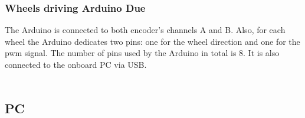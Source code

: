 
\subsubsection{Wheels driving Arduino Due}
The Arduino is connected to both encoder's channels A and B. Also, for each wheel the Arduino dedicates two pins: one for the wheel direction and one for the pwm signal. The number of 
pins used by the Arduino in total is 8. It is also connected to the onboard PC via USB.
\\ \\

\subsection{PC}




